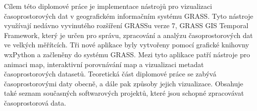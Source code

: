 \begin{mtabstract}[Abstrakt]

Cílem této diplomové práce je implementace nástrojů pro vizualizaci
časo\-pros\-torových dat v geografickém informačním systému GRASS.
Tyto nástroje využívají nedávno vyvinutého rozšíření GRASSu verze 7,
GRASS GIS Temporal Framework, který je určen pro správu, zpracování a analýzu
časoprostorových dat ve velkých měřítcích. Tři nové aplikace byly
vytvořeny pomocí grafické knihovny wxPython a začleněny do systému GRASS.
Mezi tyto aplikace patří nástroje pro animaci map, interaktivní porovnávání map
a vizualizaci metadat časoprostorových datasetů.
Teoretická část diplomové práce se zabývá časoprostorovými daty obecně,
a dále pak způsoby jejich vizualizace. Obsahuje také seznam současných softwarových
projektů, které jsou schopné zpracovávat časoprostorová data.


\bigskip
\bigskip
\bigskip
\bigskip


\end{mtabstract}
